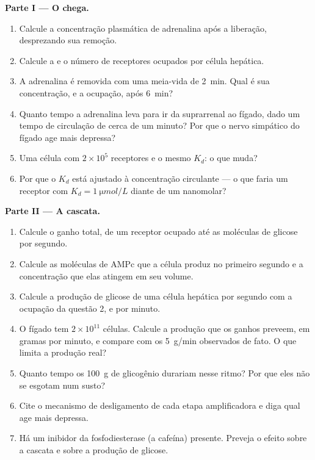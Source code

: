 \begin{problem}
\medskip
\noindent\textbf{Parte I --- O  chega.}
\begin{enumerate}
  \item Calcule a concentração plasmática de adrenalina após a
        liberação, desprezando sua remoção.
  \item Calcule a  e o número de receptores
        ocupados por célula hepática.
  \item A adrenalina é removida com uma meia-vida de \qty{2}{min}. Qual
        é sua concentração, e a ocupação, após \qty{6}{min}?
  \item Quanto tempo a adrenalina leva para ir da suprarrenal ao fígado,
        dado um tempo de circulação de cerca de um minuto? Por que o
        nervo simpático do fígado age mais depressa?
  \item Uma célula com $2\times 10^{5}$ receptores e o mesmo $K_d$: o
        que muda?
  \item Por que o $K_d$ está ajustado à concentração circulante --- o
        que faria um receptor com $K_d = \qty{1}{\micro mol/L}$ diante de
        um  nanomolar?
\end{enumerate}

\medskip
\noindent\textbf{Parte II --- A cascata.}
\begin{enumerate}[resume]
  \item Calcule o ganho total, de um receptor ocupado até as moléculas
        de glicose por segundo.
  \item Calcule as moléculas de AMPc que a célula produz no primeiro
        segundo e a concentração que elas atingem em seu volume.
  \item Calcule a produção de glicose de uma célula hepática por segundo
        com a ocupação da questão 2, e por minuto.
  \item O fígado tem $2\times 10^{11}$ células. Calcule a produção que os
        ganhos preveem, em gramas por minuto, e compare com os
        \qty{5}{g/min} observados de fato. O que limita a produção real?
  \item Quanto tempo os \qty{100}{g} de glicogênio durariam nesse ritmo?
        Por que eles não se esgotam num susto?
  \item Cite o mecanismo de desligamento de cada etapa amplificadora e
        diga qual age mais depressa.
  \item Há um inibidor da fosfodiesterase (a cafeína) presente. Preveja
        o efeito sobre a cascata e sobre a produção de glicose.
\end{enumerate}


\end{problem}

